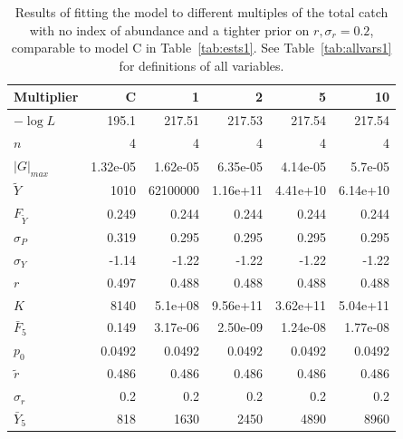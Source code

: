 \documentclass[12pt,letterpaper]{article}
\newcommand\MSY{\widetilde{Y}}
\newcommand\Fmsy{F_{\MSY}}
\begin{document}
\begin{table}
{\small
\caption{Results of fitting the model to different multiples of the
total catch with no index of abundance and a tighter
prior on $r, \sigma_r = 0.2$, comparable to model C in Table~\ref{tab:ests1}.
See Table~\ref{tab:allvars1} for definitions of all variables.
\label{tab:k0}}
\begin{center}
\begin{tabular}{|l|r|rrrr|}
\hline
Multiplier & C & 1 & 2 & 5 & 10\\
\hline
\hline
$-\log L$ & 195.1 & 217.51 & 217.53 & 217.54 & 217.54\\
$n$ & 4 & 4 & 4 & 4 & 4\\
$|G|_{max}$ & 1.32e-05 & 1.62e-05 & 6.35e-05 & 4.14e-05 & 5.7e-05\\
\hline
$\MSY$ & 1010 & 62100000 & 1.16e+11 & 4.41e+10 & 6.14e+10\\
$\Fmsy$ & 0.249 & 0.244 & 0.244 & 0.244 & 0.244\\
$\sigma_P$ & 0.319 & 0.295 & 0.295 & 0.295 & 0.295\\
$\sigma_Y$ & -1.14 & -1.22 & -1.22 & -1.22 & -1.22\\
\hline
$r$ & 0.497 & 0.488 & 0.488 & 0.488 & 0.488\\
$K$ & 8140 & 5.1e+08 & 9.56e+11 & 3.62e+11 & 5.04e+11\\
$\bar{F}_5$ & 0.149 & 3.17e-06 & 2.50e-09 & 1.24e-08 & 1.77e-08\\
\hline
$p_0$ & 0.0492 & 0.0492 & 0.0492 & 0.0492 & 0.0492\\
$\tilde{r}$ & 0.486 & 0.486 & 0.486 & 0.486 & 0.486\\
$\sigma_r$ & 0.2 & 0.2 & 0.2 & 0.2 & 0.2\\
$\bar{Y}_5$ & 818 & 1630 & 2450 & 4890 & 8960\\
\hline
\end{tabular}
\end{center}
}
\end{table}
\end{document}
